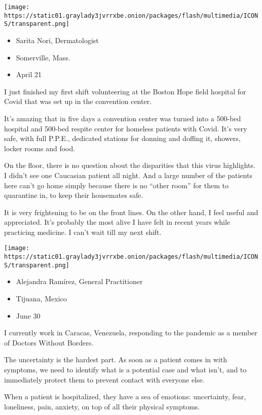 \texttt{[image: https://static01.graylady3jvrrxbe.onion/packages/flash/multimedia/ICONS/transparent.png]}

\begin{itemize}
\tightlist
\item
  Sarita Nori, Dermatologist
\item
  Somerville, Mass.
\item
  April 21
\end{itemize}

I just finished my first shift volunteering at the Boston Hope field
hospital for Covid that was set up in the convention center.

It's amazing that in five days a convention center was turned into a
500-bed hospital and 500-bed respite center for homeless patients with
Covid. It's very safe, with full P.P.E., dedicated stations for donning
and doffing it, showers, locker rooms and food.

On the floor, there is no question about the disparities that this virus
highlights. I didn't see one Caucasian patient all night. And a large
number of the patients here can't go home simply because there is no
``other room'' for them to quarantine in, to keep their housemates safe.

It is very frightening to be on the front lines. On the other hand, I
feel useful and appreciated. It's probably the most alive I have felt in
recent years while practicing medicine. I can't wait till my next shift.

\texttt{[image: https://static01.graylady3jvrrxbe.onion/packages/flash/multimedia/ICONS/transparent.png]}

\begin{itemize}
\tightlist
\item
  Alejandra Ramírez, General Practitioner
\item
  Tijuana, Mexico
\item
  June 30
\end{itemize}

I currently work in Caracas, Venezuela, responding to the pandemic as a
member of Doctors Without Borders.

The uncertainty is the hardest part. As soon as a patient comes in with
symptoms, we need to identify what is a potential case and what isn't,
and to immediately protect them to prevent contact with everyone else.

When a patient is hospitalized, they have a sea of emotions:
uncertainty, fear, loneliness, pain, anxiety, on top of all their
physical symptoms.

